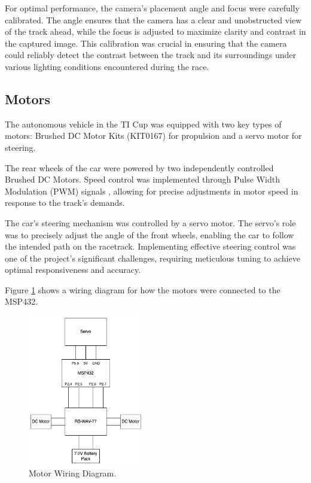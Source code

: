 \documentclass[conference]{IEEEtran}
\begin{document}
For optimal performance, the camera's placement angle and focus were carefully calibrated. The angle ensures that the camera has a clear and unobstructed view of the track ahead, while the focus is adjusted to maximize clarity and contrast in the captured image. This calibration was crucial in ensuring that the camera could reliably detect the contrast between the track and its surroundings under various lighting conditions encountered during the race.

\subsection{Motors}

The autonomous vehicle in the TI Cup was equipped with two key types of motors: Brushed DC Motor Kits (KIT0167) for propulsion and a servo motor for steering.

The rear wheels of the car were powered by two independently controlled Brushed DC Motors. Speed control was implemented through Pulse Width Modulation (PWM) signals \cite{motors}, allowing for precise adjustments in motor speed in response to the track's demands.

The car's steering mechanism was controlled by a servo motor. The servo's role was to precisely adjust the angle of the front wheels, enabling the car to follow the intended path on the racetrack. Implementing effective steering control was one of the project's significant challenges, requiring meticulous tuning to achieve optimal responsiveness and accuracy.

Figure \ref{fig:motorWiring} shows a wiring diagram for how the motors were connected to the MSP432.

\begin{figure}[htbp]
	\centerline{\includegraphics[width=0.45\textwidth]{images/motorsWiring.png}}
	\caption{Motor Wiring Diagram.}
	\label{fig:motorWiring}
\end{figure}
\end{document}
